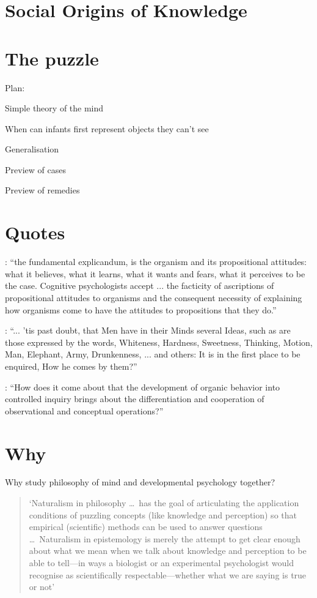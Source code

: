 \documentclass[12pt,\papersize]{extarticle}
\begin{document}
\section{Social Origins of Knowledge}




\section{The puzzle}
\label{sec:puzzle}

Plan:

Simple theory of the mind

When can infants first represent objects they can't see

Generalisation

Preview of cases

Preview of remedies


\section{Quotes}

\citep[p.\ 198]{Fodor:1975pb}: “the fundamental explicandum, is the organism and its propositional attitudes: what it believes, what it learns, what it wants and fears, what it perceives to be the case. Cognitive psychologists accept ... the facticity of ascriptions of propositional attitudes to organisms and the consequent necessity of explaining how organisms come to have the attitudes to propositions that they do.”

\citep[p.\ 104]{Locke:1975qo}: “... ’tis past doubt, that Men have in their Minds several Ideas, such as are those expressed by the words, Whiteness, Hardness, Sweetness, Thinking, Motion, Man, Elephant, Army, Drunkenness, ... and others: It is in the first place to be enquired, How he comes by them?”

\citep[p.\ 12]{Dewey:1938yp}: “How does it come about that the development of organic behavior into controlled inquiry brings about the differentiation and cooperation of observational and conceptual operations?”

\section{Why}
Why study philosophy of mind and developmental psychology together?

\begin{quote}
`Naturalism in philosophy …\ has the goal of articulating the application conditions of puzzling concepts (like knowledge and perception) so that empirical (scientific) methods can be used to answer questions  …\ Naturalism in epistemology is merely the attempt to get clear enough about what we mean when we talk about knowledge and perception to be able to tell—in ways a biologist or an experimental psychologist would recognise as scientifically respectable—whether what we are saying is true or not' \citep[p.\ x]{Dretske:2000ky}
\end{quote}


\end{document}
